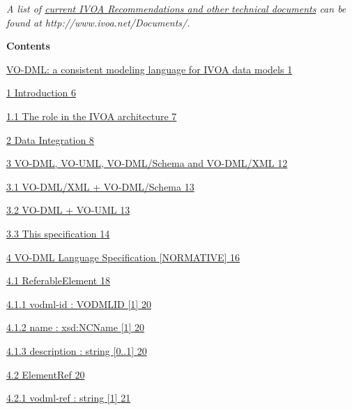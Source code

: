 \documentclass[10pt,a4paper]{ivoa}
\begin{document}
\emph{A list of \href{http://www.ivoa.net/Documents/}{current IVOA
Recommendations and other technical documents} can be found at
http://www.ivoa.net/Documents/.}

\hfill\break
\textbf{Contents}

\protect\hyperlink{_Toc513524804}{VO-DML: a consistent modeling language
for IVOA data models \protect\hyperlink{_Toc513524804}{1}}

\protect\hyperlink{introduction}{1 Introduction
\protect\hyperlink{introduction}{6}}

\protect\hyperlink{the-role-in-the-ivoa-architecture}{1.1 The role in
the IVOA architecture
\protect\hyperlink{the-role-in-the-ivoa-architecture}{7}}

\protect\hyperlink{data-integration}{2 Data Integration
\protect\hyperlink{data-integration}{8}}

\protect\hyperlink{vo-dml-vo-uml-vo-dmlschema-and-vo-dmlxml}{3 VO-DML,
VO-UML, VO-DML/Schema and VO-DML/XML
\protect\hyperlink{vo-dml-vo-uml-vo-dmlschema-and-vo-dmlxml}{12}}

\protect\hyperlink{vo-dmlxml-vo-dmlschema}{3.1 VO-DML/XML +
VO-DML/Schema \protect\hyperlink{vo-dmlxml-vo-dmlschema}{13}}

\protect\hyperlink{vo-dml-vo-uml}{3.2 VO-DML + VO-UML
\protect\hyperlink{vo-dml-vo-uml}{13}}

\protect\hyperlink{this-specification}{3.3 This specification
\protect\hyperlink{this-specification}{14}}

\protect\hyperlink{vo-dml-language-specification-normative}{4 VO-DML
Language Specification {[}NORMATIVE{]}
\protect\hyperlink{vo-dml-language-specification-normative}{16}}

\protect\hyperlink{referableelement}{4.1 ReferableElement
\protect\hyperlink{referableelement}{18}}

\protect\hyperlink{vodml-id-vodmlid-1}{4.1.1 vodml-id : VODMLID {[}1{]}
\protect\hyperlink{vodml-id-vodmlid-1}{20}}

\protect\hyperlink{name-xsdncname-1}{4.1.2 name : xsd:NCName {[}1{]}
\protect\hyperlink{name-xsdncname-1}{20}}

\protect\hyperlink{description-string-0..1}{4.1.3 description : string
{[}0..1{]} \protect\hyperlink{description-string-0..1}{20}}

\protect\hyperlink{elementref}{4.2 ElementRef
\protect\hyperlink{elementref}{20}}

\protect\hyperlink{vodml-ref-string-1}{4.2.1 vodml-ref : string {[}1{]}
\protect\hyperlink{vodml-ref-string-1}{21}}
\end{document}
